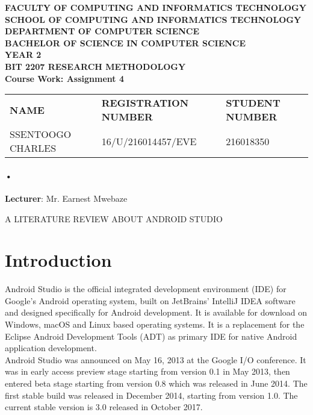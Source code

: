 \documentclass[7pt]{article}
\begin{document}
\begin{Huge}
\begin{center}
\begin{normalsize}

\textbf{FACULTY OF COMPUTING AND INFORMATICS TECHNOLOGY} \\
\textbf{SCHOOL OF COMPUTING AND INFORMATICS TECHNOLOGY} \\
\textbf{DEPARTMENT OF COMPUTER SCIENCE} \\
\textbf{BACHELOR OF SCIENCE IN COMPUTER SCIENCE} \\
\textbf{YEAR 2} \\
\textbf{BIT 2207 RESEARCH METHODOLOGY} \\
\textbf{Course Work: Assignment 4}\\
\end{normalsize}
\end{center}
\end{Huge}

\begin{center}
\begin{tabular}{l l l}
\textbf{NAME}  & \textbf{REGISTRATION NUMBER} & \textbf{STUDENT NUMBER} \\
SSENTOOGO CHARLES & 16/U/216014457/EVE & 216018350 \\
\end{tabular}

\paragraph{•}
\textbf{Lecturer}: Mr. Earnest Mwebaze
\end{center}

\newpage

A LITERATURE REVIEW ABOUT ANDROID STUDIO
\section{Introduction}
Android Studio is the official integrated development environment (IDE) for Google's Android operating system, built on JetBrains' IntelliJ IDEA software and designed specifically for Android development.\cite{r1} It is available for download on Windows, macOS and Linux based operating systems. It is a replacement for the Eclipse Android Development Tools (ADT) as primary IDE for native Android application development.
\\
Android Studio was announced on May 16, 2013 at the Google I/O conference. It was in early access preview stage starting from version 0.1 in May 2013, then entered beta stage starting from version 0.8 which was released in June 2014. The first stable build was released in December 2014, starting from version 1.0. The current stable version is 3.0 released in October 2017.
\end{document}
